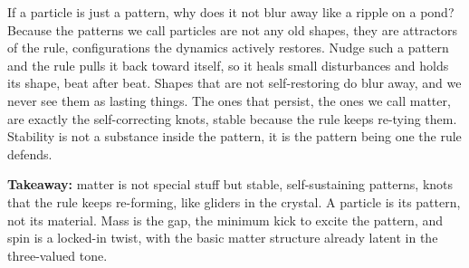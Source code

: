 If a particle is just a pattern, why does it not blur away like a ripple on a pond? Because the patterns we call particles are not any old shapes, they are attractors of the rule, configurations the dynamics actively restores. Nudge such a pattern and the rule pulls it back toward itself, so it heals small disturbances and holds its shape, beat after beat. Shapes that are not self-restoring do blur away, and we never see them as lasting things. The ones that persist, the ones we call matter, are exactly the self-correcting knots, stable because the rule keeps re-tying them. Stability is not a substance inside the pattern, it is the pattern being one the rule defends.

\textbf{Takeaway:} matter is not special stuff but stable, self-sustaining patterns, knots that the rule keeps re-forming, like gliders in the crystal. A particle is its pattern, not its material. Mass is the gap, the minimum kick to excite the pattern, and spin is a locked-in twist, with the basic matter structure already latent in the three-valued tone.
